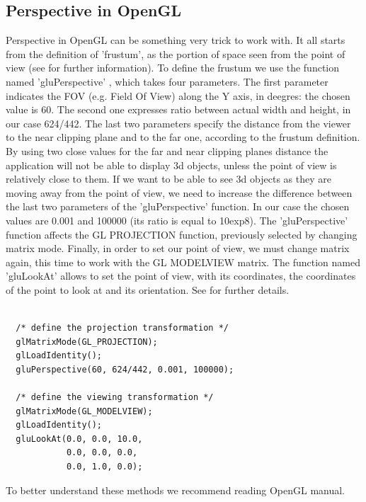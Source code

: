 \subsection{Perspective in OpenGL}

Perspective in OpenGL can be something very trick to work with. It all starts from the definition of 'frustum', as the portion
of space seen from the point of view (see \cite{wiki:frustum} for further information). To define the frustum we use the function
named 'gluPerspective' \cite{opengl:gluPerspective}, which takes four parameters.
\newline The first parameter indicates the FOV (e.g. Field Of View) along the Y axis, in deegres: the chosen value is 60. The
second one expresses ratio between actual width and height, in our case 624/442. The last two parameters specify the distance from
the viewer to the near clipping plane and to the far one, according to the frustum definition.
\newline By using two close values for the far and near clipping planes distance the application will not be able to display 3d
objects, unless the point of view is relatively close to them. If we want to be able to see 3d objects as they are moving away
from the point of view, we need to increase the difference between the last two parameters of the 'gluPerspective' function. In
our case the chosen values are 0.001 and 100000 (its ratio is equal to 10exp8).
\newline The 'gluPerspective' function affects the GL PROJECTION function, previously selected by changing matrix mode. Finally,
in order to set our point of view, we must change matrix again, this time to work with the GL MODELVIEW matrix. The function named
'gluLookAt' allows to set the point of view, with its coordinates, the coordinates of the point to look at and its orientation.
See \cite{opengl:gluLookAt} for further details.

\begin{lstlisting}

  /* define the projection transformation */
  glMatrixMode(GL_PROJECTION);
  glLoadIdentity();
  gluPerspective(60, 624/442, 0.001, 100000);
  
  /* define the viewing transformation */
  glMatrixMode(GL_MODELVIEW);
  glLoadIdentity();
  gluLookAt(0.0, 0.0, 10.0,
            0.0, 0.0, 0.0,
            0.0, 1.0, 0.0);

\end{lstlisting}

To better understand these methods we recommend reading OpenGL manual.


